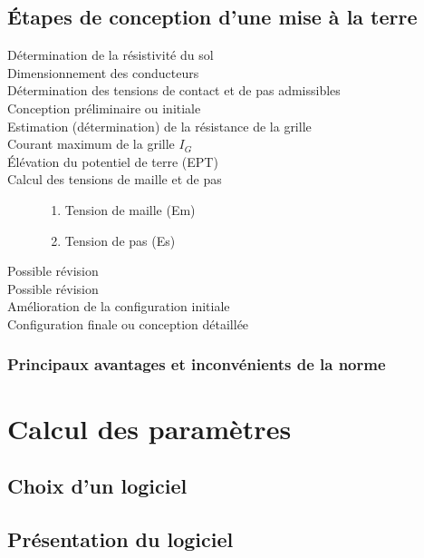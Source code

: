 		\subsection{Étapes de conception d'une mise à la terre}
			\begin{description}
			\item[Détermination de la résistivité du sol]
			\item[Dimensionnement des conducteurs]
			\item[Détermination des tensions de contact et de pas admissibles]
			\item[Conception préliminaire ou initiale]
			\item[Estimation (détermination) de la résistance de la grille]
			\item[Courant maximum de la grille $I_{G}$]
			\item[Élévation du potentiel de terre (EPT)]
			\item[Calcul des tensions de maille et de pas]
				\begin{enumerate}
				\item Tension de maille (Em)
				\item Tension de pas (Es)
				\end{enumerate}
			\item[Possible révision]
			\item[Possible révision]
			\item[Amélioration de la configuration initiale]
			\item[Configuration finale ou conception détaillée]
			\end{description}
		\subsubsection{Principaux avantages et inconvénients de la norme}
	\section{Calcul des paramètres}
		\subsection{Choix d'un logiciel}
		\subsection{Présentation du logiciel}
		